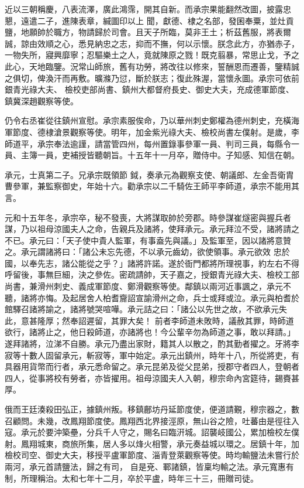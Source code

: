 \begin{pinyinscope}
 近以三朝稱慶，八表流澤，廣此鴻霈，開其自新。而承宗果能翻然改圖，披露忠懇，遠遣二子，進陳表章，緘圖印以上
 聞，獻德、棣之名部，發囷奉粟，並灶貢鹽，地願帥於職方，物請歸於司會。且天子所臨，莫非王土；析茲舊服，將表爾誠，諒由效順之心，悉見納忠之志，抑而不撫，何以示懷。朕念此方，亦猶赤子，一物失所，寢興靡寧；忍驅樂土之人，竟就陳原之戮！既克翦暴，常思止戈，予之此心，天地臨鑒。況常山師旅，舊有功勞，將改往以修來，誓酬恩而遷善，鑒精誠之俱切，俾渙汗而再敷。曠滌乃愆，斷於朕志；復此殊渥，當懷永圖。承宗可依前銀青光祿大夫、
 檢校吏部尚書、鎮州大都督府長史、御史大夫，充成德軍節度、鎮冀深趙觀察等使。



 仍令右丞崔從往鎮州宣慰。承宗素服俟命，乃以華州刺史鄭權為德州刺史，充橫海軍節度、德棣滄景觀察等使。明年，加金紫光祿大夫、檢校尚書左僕射。是歲，李師道平，承宗奉法逾謹，請當管四州，每州置錄事參軍一員、判司三員，每縣令一員、主簿一員，吏補授皆聽朝旨。十五年十一月卒，贈侍中。子知感、知信在朝。



 承元，士真第二子。兄承宗既領節
 鉞，奏承元為觀察支使、朝議郎、左金吾衛胄曹參軍，兼監察御史，年始十六。勸承宗以二千騎佐王師平李師道，承宗不能用其言。



 元和十五年冬，承宗卒，秘不發喪，大將謀取帥於旁郡。時參謀崔燧密與握兵者謀，乃以祖母涼國夫人之命，告親兵及諸將，使拜承元。承元拜泣不受，諸將請之不已。承元曰：「天子使中貴人監軍，有事盍先與議。」及監軍至，因以諸將意贊之。承元謂諸將曰：「諸公未忘先德，不以承元齒幼，欲使領事。承元欲效
 忠於國，以奉先志，諸公能從之乎？」諸將許諾。遂於衙門都將所理視事，約左右不得呼留後，事無巨細，決之參佐。密疏請帥，天子嘉之，授銀青光祿大夫、檢校工部尚書，兼滑州刺史、義成軍節度、鄭滑觀察等使。鄰鎮以兩河近事諷之，承元不聽，諸將亦悔。及起居舍人柏耆齎詔宣諭滑州之命，兵士或拜或泣。承元與柏耆於館驛召諸將諭之，諸將號哭喧嘩。承元詰之曰：「諸公以先世之故，不欲承元失此，意甚隆厚；然奉詔遲留，其罪大矣！
 前者李師道未敗時，議赦其罪，時師道欲行，諸將止之，他日殺師道，亦諸將也！今公輩辛勿為師道之事，敢以拜請。」遂拜諸將，泣涕不自勝。承元乃盡出家財，籍其人以散之，酌其勤者擢之。牙將李寂等十數人固留承元，斬寂等，軍中始定。承元出鎮州，時年十八，所從將吏，有具器用貨幣而行者，承元悉命留之。承元昆弟及從父昆弟，授郡守者四人，登朝者四人，從事將校有勞者，亦皆擢用。祖母涼國夫人入朝，穆宗命內宮筵待，錫賚甚
 厚。



 俄而王廷湊殺田弘正，據鎮州叛。移鎮鄜坊丹延節度使，便道請覲，穆宗器之，數召顧問。未幾，改鳳翔節度使。鳳翔西北界接涇原，無山谷之險，吐蕃由是徑往入寇。承元於要沖築壘，分兵千人守之，賜名曰臨汧城。詔襲岐國公，累加檢校左僕射。鳳翔城東，商旅所集，居人多以烽火相警，承元奏益城以環之。居鎮十年，加檢校司空、御史大夫，移授平盧軍節度、淄青登萊觀察等使。時均輸鹽法未嘗行於兩河，承元首請鹽法，歸之有司，
 自是兗、鄆諸鎮，皆稟均輸之法。承元寬惠有制，所理稱治。太和七年十二月，卒於平盧，時年三十三，冊贈司徒。




\end{pinyinscope}
